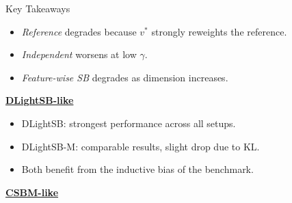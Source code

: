 \documentclass[final]{beamer}
\newlength{\colwidth}
\begin{document}
\begin{frame}[t]
\begin{columns}[t]
\begin{column}{\colwidth}
\begin{exampleblock}{Key Takeaways}
\begin{minipage}[t]{0.31\linewidth}
            \begin{itemize}\setlength{\itemindent}{0pt}
                  \item \textit{Reference} {\color{Red}degrades} because $v^*$ strongly reweights the reference.
                  \item \textit{Independent} {\color{Red}worsens} at low $\gamma$.
                  \item \textit{Feature-wise SB} {\color{Red}degrades} as dimension increases.
            \end{itemize}
            \vspace{3mm}
            \setlength{\fboxsep}{15pt}
        \end{minipage}
        \hspace{0.2em}   %
        \vrule
        \hspace{0.2em}   %
        \begin{minipage}[t]{0.31\linewidth}
            \centering
            \underline{\textbf{DLightSB-like}}
            \vspace{2mm}
            
            \begin{itemize}\setlength{\itemindent}{0pt}
                  \item DLightSB: {\color{Green}strongest} performance across all setups.
                  \item DLightSB-M: comparable results, {\color{Orange}slight drop} due to KL.
                  \item Both {\color{Red}benefit from the inductive bias} of the benchmark.
            \end{itemize}
            \vspace{4mm}
            \setlength{\fboxsep}{15pt} 
        \end{minipage}
        \hspace{0.2em}
        \vrule
        \hspace{2mm}
        \begin{minipage}[t]{0.31\linewidth}
        \centering
        \underline{\textbf{CSBM-like}}
        \vspace{2mm}
        

\end{minipage}
\end{exampleblock}
\end{column}
\end{columns}
\end{frame}
\end{document}
